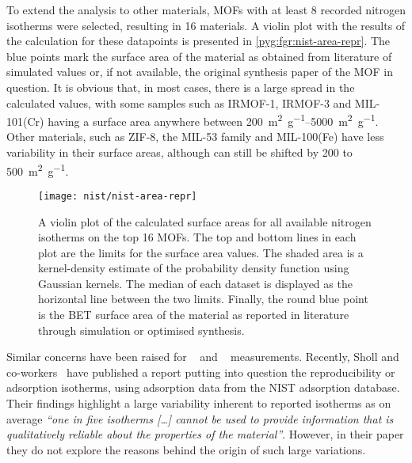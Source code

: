 To extend the analysis to other materials, MOFs with 
at least 8 recorded nitrogen isotherms were selected, resulting in 
16 materials. A violin plot with the results of the calculation for 
these datapoints is presented in \autoref{pyg:fgr:nist-area-repr}.
The blue points mark the surface area of the material as
obtained from literature of simulated values or, if not available,
the original synthesis paper of the MOF in question.
It is obvious that, in most cases, there is a large spread in
the calculated values, with some samples such as IRMOF-1,
IRMOF-3 and MIL-101(Cr) having a surface area anywhere
between \SIrange{200}{5000}{\metre^2\per\gram}. Other materials, 
such as ZIF-8, the MIL-53 family
and MIL-100(Fe) have less variability in their surface areas,
although can still be shifted by 200 to \SI{500}{\metre^2\per\gram}.

\begin{figure}[tb]
    \centering
    \texttt{[image: nist/nist-area-repr]}%
    \caption{A violin plot of the calculated surface areas for 
    all available nitrogen isotherms on the top 16 MOFs. 
    The top and bottom lines in each plot are the limits for 
    the surface area values. The shaded area is a kernel-density estimate
    of the probability density function using Gaussian kernels.
    The median of each dataset is displayed as the horizontal line
    between the two limits. Finally, the round blue point is the 
    BET surface area of the material as reported in literature through
    simulation or optimised synthesis.}%
    \label{pyg:fgr:nist-area-repr}
\end{figure}

Similar concerns have been
raised for ~\cite{broomIrreproducibilityHydrogenStorage2016}
and ~\cite{espinalMeasurementStandardsData2013} measurements.
Recently, Sholl and co-workers~\cite{parkHowReproducibleAre2017}
have published a report putting into question the reproducibility
or adsorption isotherms, using  adsorption data from the 
NIST adsorption database. Their findings highlight a large
variability inherent
to reported isotherms as on average \textit{``one in five  
isotherms [\ldots] cannot be used to provide information that 
is qualitatively reliable about the properties of the material''}.
However, in their paper they do not explore the reasons behind the
origin of such large variations.

